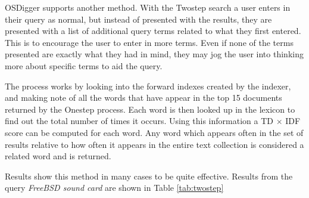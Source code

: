 OSDigger supports another method.  With the Twostep search a user enters in their query as normal, but instead of presented with the results, they are presented with a list of additional query terms related to what they first entered.  This is to encourage the user to enter in more terms.  Even if none of the terms presented are exactly what they had in mind, they may jog the user into thinking more about specific terms to aid the query.

The process works by looking into the forward indexes created by the indexer, and making note of all the words that have appear in the top 15 documents returned by the Onestep process.  Each word is then looked up in the lexicon to find out the total number of times it occurs.  Using this information a TD $\times$ IDF score can be computed for each word.  Any word which appears often in the set of results relative to how often it appears in the entire text collection is considered a related word and is returned.

Results show this method in many cases to be quite effective.  Results from the query \emph{FreeBSD sound card} are shown in Table \ref{tab:twostep}

